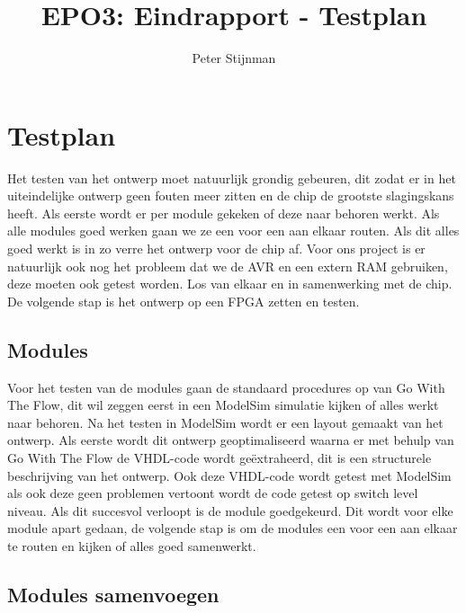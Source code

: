 \documentclass{scrartcl} %
\author{Peter Stijnman}
\title{EPO3: Eindrapport - Testplan}
\begin{document}
\chapter{Testplan}
\label{ch:testplan}


Het testen van het ontwerp moet natuurlijk grondig gebeuren, dit zodat er in het uiteindelijke ontwerp geen fouten meer zitten en de chip de grootste slagingskans heeft. 
Als eerste wordt er per module gekeken of deze naar behoren werkt. Als alle modules goed werken gaan we ze een voor een aan elkaar routen. Als dit alles goed werkt is in zo verre het ontwerp voor de chip af.
Voor ons project is er natuurlijk ook nog het probleem dat we de AVR en een extern RAM gebruiken, deze moeten ook getest worden. Los van elkaar en in samenwerking met de chip.
De volgende stap is  het ontwerp op een FPGA zetten en testen.

\section{Modules}

Voor het testen van de modules gaan de standaard procedures op van Go With The Flow, dit wil zeggen eerst in een ModelSim simulatie kijken of alles werkt naar behoren. 
Na het testen in ModelSim wordt er een layout gemaakt van het ontwerp. Als eerste wordt dit ontwerp geoptimaliseerd waarna er met behulp van Go With The Flow de VHDL-code wordt geëxtraheerd,
dit is een structurele beschrijving van het ontwerp. Ook deze VHDL-code wordt getest met ModelSim als ook deze geen problemen vertoont wordt de code getest op switch level niveau. Als dit succesvol verloopt is de module goedgekeurd.
Dit wordt voor elke module apart gedaan, de volgende stap is om de modules een voor een aan elkaar te routen en kijken of alles goed samenwerkt.



\section{Modules samenvoegen}
\end{document}
